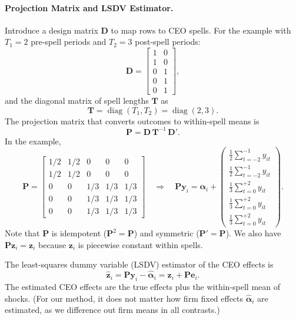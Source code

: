 \documentclass[11pt,a4paper]{article}
\begin{document}
\paragraph{Projection Matrix and LSDV Estimator.} Introduce a design matrix $\mathbf D$ to map rows to CEO spells. For the example with $T_1=2$ pre-spell periods and $T_2=3$ post-spell periods:
\[
  \mathbf D = \begin{bmatrix}
    1 & 0\\
    1 & 0\\
    0 & 1\\
    0 & 1\\
    0 & 1
  \end{bmatrix},
\]
and the diagonal matrix of spell lengths $\mathbf T$ as
$$
  \mathbf T = \operatorname{diag}(T_1,T_2)=\operatorname{diag}(2,3).
$$
The projection matrix that converts outcomes to within-spell means is
$$
  \mathbf P = \mathbf D\,\mathbf T^{-1}\,\mathbf D'.
$$
In the example,
\[
  \mathbf P = \begin{bmatrix}
    1/2 & 1/2 & 0 & 0 & 0\\
    1/2 & 1/2 & 0 & 0 & 0\\
    0 & 0 & 1/3 & 1/3 & 1/3\\
    0 & 0 & 1/3 & 1/3 & 1/3\\
    0 & 0 & 1/3 & 1/3 & 1/3
  \end{bmatrix}\quad\Rightarrow\quad
  \mathbf {Py}_i = 
  \mathbf\alpha_i +
  \begin{pmatrix}
  \frac12 \sum_{t=-2}^{-1} y_{it} \\
  \frac12 \sum_{t=-2}^{-1} y_{it} \\
  \frac13 \sum_{t=0}^{+2} y_{it}\\
  \frac13 \sum_{t=0}^{+2} y_{it}\\
  \frac13 \sum_{t=0}^{+2} y_{it}
  \end{pmatrix}.
\]
Note that $\mathbf P$ is idempotent ($\mathbf P^2=\mathbf P$) and symmetric ($\mathbf P'=\mathbf P$). We also have $\mathbf P\mathbf z_i = \mathbf z_i$ because $\mathbf z_i$ is piecewise constant within spells.

The least-squares dummy variable (LSDV) estimator of the CEO effects is
\begin{equation}\label{eq:lsdv_appendix}
  \hat{\mathbf z}_i = \mathbf P\mathbf y_i - \hat{\mathbf \alpha}_i = \mathbf z_i + \mathbf P\mathbf e_i.
\end{equation}  
The estimated CEO effects are the true effects plus the within-spell mean of shocks. (For our method, it does not matter how firm fixed effects $\hat{\mathbf \alpha}_i$ are estimated, as we difference out firm means in all contrasts.)
\end{document}
